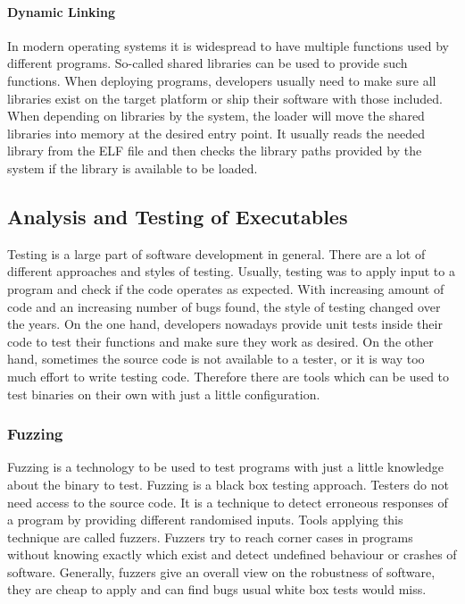 \paragraph{Dynamic Linking}

In modern operating systems it is widespread to have multiple functions used by
different programs. So-called shared libraries can be used to provide such
functions. When deploying programs, developers usually need to make sure all
libraries exist on the target platform or ship their software with those
included. When depending on libraries by the system, the loader will move the
shared libraries into memory at the desired entry point. It usually reads the
needed library from the ELF file and then checks the library paths provided by
the system if the library is available to be loaded.

\subsection{Analysis and Testing of Executables}

Testing is a large part of software development in general. There are a lot of
different approaches and styles of testing. Usually, testing was to apply input
to a program and check if the code operates as expected. With increasing amount
of code and an increasing number of bugs found, the style of testing changed
over the years. On the one hand, developers nowadays provide unit tests inside
their code to test their functions and make sure they work as desired. On the
other hand, sometimes the source code is not available to a tester, or it is way
too much effort to write testing code. Therefore there are tools which can be
used to test binaries on their own with just a little configuration.

\subsubsection{Fuzzing}

Fuzzing is a technology to be used to test programs with just a little knowledge
about the binary to test. Fuzzing is a black box testing approach. Testers do
not need access to the source code. It is a technique to detect erroneous
responses of a program by providing different randomised inputs. Tools applying
this technique are called fuzzers. Fuzzers try to reach corner cases in programs
without knowing exactly which exist and detect undefined behaviour or crashes of
software. Generally, fuzzers give an overall view on the robustness of software,
they are cheap to apply and can find bugs usual white box tests would miss.

